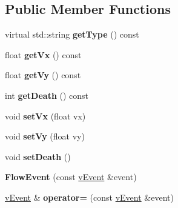 \subsection*{Public Member Functions}
\begin{DoxyCompactItemize}
\item 
\hypertarget{classemorph_1_1FlowEvent_a263969834e5951fbd45a6cde694acc9d}{virtual std\-::string {\bfseries get\-Type} () const }\label{classemorph_1_1FlowEvent_a263969834e5951fbd45a6cde694acc9d}

\item 
\hypertarget{classemorph_1_1FlowEvent_a200264a57db531501059c85924180bec}{float {\bfseries get\-Vx} () const }\label{classemorph_1_1FlowEvent_a200264a57db531501059c85924180bec}

\item 
\hypertarget{classemorph_1_1FlowEvent_ac8f2dec01073ad7028707f6f24c37453}{float {\bfseries get\-Vy} () const }\label{classemorph_1_1FlowEvent_ac8f2dec01073ad7028707f6f24c37453}

\item 
\hypertarget{classemorph_1_1FlowEvent_acdc608f912f6dacb7d562a57274515a6}{int {\bfseries get\-Death} () const }\label{classemorph_1_1FlowEvent_acdc608f912f6dacb7d562a57274515a6}

\item 
\hypertarget{classemorph_1_1FlowEvent_ad8a37138f5ca4f7939afee340547022a}{void {\bfseries set\-Vx} (float vx)}\label{classemorph_1_1FlowEvent_ad8a37138f5ca4f7939afee340547022a}

\item 
\hypertarget{classemorph_1_1FlowEvent_a818fba434fe4ddbe25e982c4f28c0d87}{void {\bfseries set\-Vy} (float vy)}\label{classemorph_1_1FlowEvent_a818fba434fe4ddbe25e982c4f28c0d87}

\item 
\hypertarget{classemorph_1_1FlowEvent_a3f3fe8eb008bfe643193522d787339ec}{void {\bfseries set\-Death} ()}\label{classemorph_1_1FlowEvent_a3f3fe8eb008bfe643193522d787339ec}

\item 
\hypertarget{classemorph_1_1FlowEvent_acc206219709976fbdfe2792acd0514e8}{{\bfseries Flow\-Event} (const \hyperlink{classemorph_1_1vEvent}{v\-Event} \&event)}\label{classemorph_1_1FlowEvent_acc206219709976fbdfe2792acd0514e8}

\item 
\hypertarget{classemorph_1_1FlowEvent_a8039f858a37816ea202be33201a8e716}{\hyperlink{classemorph_1_1vEvent}{v\-Event} \& {\bfseries operator=} (const \hyperlink{classemorph_1_1vEvent}{v\-Event} \&event)}\label{classemorph_1_1FlowEvent_a8039f858a37816ea202be33201a8e716}


\end{DoxyCompactItemize}

